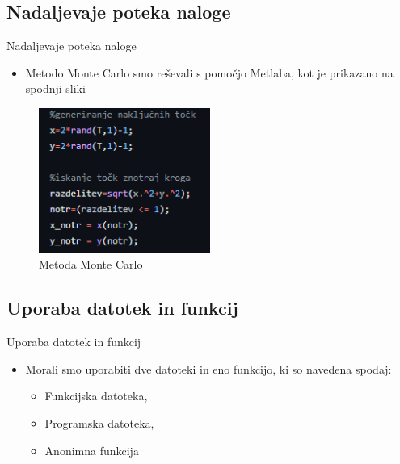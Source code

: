 \documentclass{beamer}
\begin{document}
\subsection{Nadaljevaje poteka naloge}
\begin{frame}{Nadaljevaje poteka naloge}
    \begin{itemize}
    \item Metodo Monte Carlo smo reševali s pomočjo Metlaba, kot je prikazano na spodnji sliki
\end{itemize}
\begin{figure}
  \centering
  \includegraphics[width=0.5\textwidth]{Slike/MC1.png}
  \caption{Metoda Monte Carlo}
\end{figure}
\end{frame}

\subsection{Uporaba datotek in funkcij}
\begin{frame}{Uporaba datotek in funkcij}
    \begin{itemize}
    \item Morali smo uporabiti dve datoteki in eno funkcijo, ki so navedena spodaj:
    \begin{itemize}
        \item Funkcijska datoteka,
        \pause
        \item Programska datoteka,
        \pause
        \item Anonimna funkcija
    \end{itemize}
\end{itemize}
\end{frame}
\end{document}
